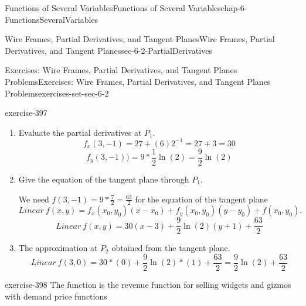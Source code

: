 \documentclass[oneside,10pt,]{book}
\numberwithin{equation}{section}
\begin{document}
\begin{chapterptx}{Functions of Several Variables}{}{Functions of Several Variables}{}{}{chap-6-FunctionsSeveralVariables}
\begin{sectionptx}{Wire Frames, Partial Derivatives, and Tangent Planes}{}{Wire Frames, Partial Derivatives, and Tangent Planes}{}{}{sec-6-2-PartialDerivatives}
\begin{exercises-subsection-numberless}{Exercises: Wire Frames, Partial Derivatives, and Tangent Planes Problems}{}{Exercises: Wire Frames, Partial Derivatives, and Tangent Planes Problems}{}{}{exercises-set-sec-6-2}
\begin{exercisegroup}
\begin{divisionexerciseeg}{3}{}{}{exercise-397}
\begin{enumerate}[label=(\alph*)]
%
\begin{equation*}
= 2x^2+2x 2^y+x^2=3x^2+(2x)2^y
\end{equation*}
%
\begin{equation*}
f_y  (x,y)=\frac{\partial}{\partial y} (x^2 )(x+2^y ) \quad (\text{ Take partial derivative wrt }y.)
\end{equation*}
%
\begin{equation*}
=\frac{\partial}{\partial y}(x^3+x^2 2^y ) \qquad\text{ (Simplify the expression.)}
\end{equation*}
%
\begin{equation*}
= x^2 2^y  \ln(2)  \qquad
(x \text{ is treated as a constant so the }x^3\text{ term drops out.)}
\end{equation*}
\item\hypertarget{li-624}{}\hypertarget{p-2259}{}%
Evaluate the partial derivatives at \(P_1\).%
%
\begin{equation*}
f_x  (3,-1)=27+(6) 2^{-1}=27+3=30
\end{equation*}
%
\begin{equation*}
f_y  (3,-1))= 9*\frac{1}{2}  \ln(2)=\frac{9}{2} \ln(2)
\end{equation*}
\item\hypertarget{li-625}{}\hypertarget{p-2260}{}%
Give the equation of the tangent plane through \(P_1\).%
\par
\hypertarget{p-2261}{}%
We need \(f(3,-1)=9*\frac{7}{2}=\frac{63}{2}\) for the equation of the tangent plane%
%
\begin{equation*}
Linear\ f(x ,y)=f_x (x_0,y_0 )(x-x_0 )+f_y (x_0,y_0 )(y-y_0 )+f(x_0,y_0 ).
\end{equation*}
%
\begin{equation*}
Linear\ f(x ,y)=30 (x-3)+\frac{9}{2}  \ln(2) (y+1)+\frac{63}{2}
\end{equation*}
\item\hypertarget{li-626}{}\hypertarget{p-2262}{}%
The approximation at \(P_2\) obtained from the tangent plane.%
%
\begin{equation*}
Linear\ f(3,0)=30* (0)+\frac{9}{2} \ln(2) *(1)+\frac{63}{2}=\frac{9}{2}  \ln(2)+\frac{63}{2}
\end{equation*}
\end{enumerate}
\end{divisionexerciseeg}%
\begin{divisionexerciseeg}{4}{}{}{exercise-398}%
\hypertarget{p-2263}{}%
The function is the revenue function for selling widgets and gizmos with demand price functions%

\end{divisionexerciseeg}
\end{exercisegroup}
\end{exercises-subsection-numberless}
\end{sectionptx}
\end{chapterptx}
\end{document}
